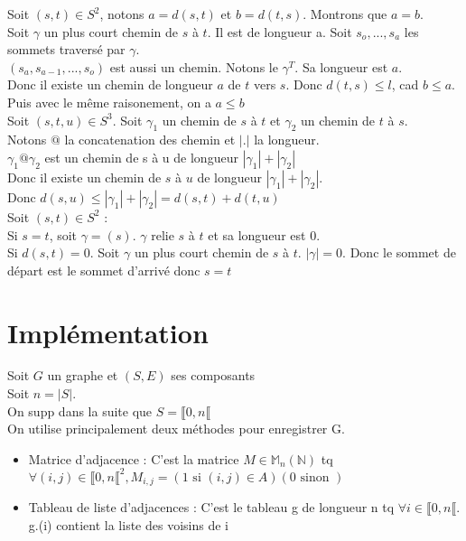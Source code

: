 \begin{dem}
Soit $(s,t) \in S^2$, notons $a=d(s,t)$ et $b=d(t,s)$. Montrons que $a=b$.\\
Soit $\gamma$ un plus court chemin de $s$ à $t$. Il est de longueur a. Soit $s_o,...,s_a$ les sommets traversé par $\gamma$.\\

$(s_a,s_{a-1},...,s_o)$ est aussi un chemin. Notons le $\gamma^T$. Sa longueur est $a$.  \\
Donc il existe un chemin de longueur $a$ de $t$ vers $s$. Donc $d(t,s)\leq l$, cad $b\leq a$.  \\
Puis avec le même raisonement, on a $a\leq b$  \\

Soit $(s,t,u) \in S^3$. Soit $\gamma_1$ un chemin de $s$ à $t$ et $\gamma_2$ un chemin de $t$ à $s$.  \\

Notons $@$ la concatenation des chemin et $|.|$ la longueur.  \\
$\gamma_1 @ \gamma_2$ est un chemin de s à u de longueur $|\gamma_1|+|\gamma_2|$  \\
Donc il existe un chemin de $s$ à $u$ de longueur $|\gamma_1|+|\gamma_2|$.  \\
Donc $d(s,u) \leq |\gamma_1|+|\gamma_2| = d(s,t)+d(t,u)$  \\

Soit $(s,t) \in S^2$ :  \\
Si $s=t$, soit $\gamma=(s)$. $\gamma$ relie $s$ à $t$ et sa longueur est $0$.  \\

Si $d(s,t)=0$. Soit $\gamma$ un plus court chemin de $s$ à $t$. $|\gamma|=0$. Donc le sommet de départ est le sommet d'arrivé donc $s=t$
\end{dem}

\section{Implémentation}

Soit $G$ un graphe et $(S,E)$ ses composants   \\
Soit $n=|S|$.  \\
On supp dans la suite que $S=\llbracket 0,n\llbracket $  \\
On utilise principalement deux méthodes pour enregistrer G.\\

\begin{itemize}
\item Matrice d'adjacence : C'est la matrice $M\in \mathbb M_n(\mathbb N)$ tq $\forall (i,j) \in \llbracket 0,n\llbracket ^2, M_{i,j}=(1 \text{ si } (i,j) \in A) (0 \text{ sinon })$
\item Tableau de liste d'adjacences : C'est le tableau g de longueur n tq $\forall i \in \llbracket 0,n\llbracket $. g.(i) contient la liste des voisins de i
\end{itemize}

